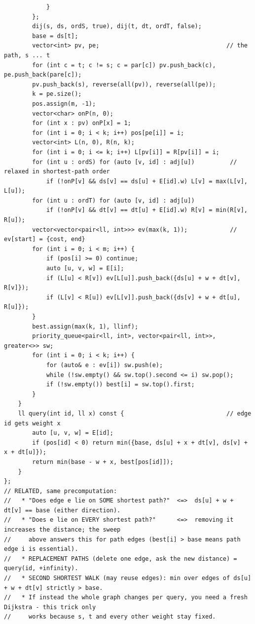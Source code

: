 \documentclass[9pt,a4paper,twocolumn]{extarticle}
\begin{document}
\begin{lstlisting}
            }
        };
        dij(s, ds, ordS, true), dij(t, dt, ordT, false);
        base = ds[t];
        vector<int> pv, pe;                                    // the path, s ... t
        for (int c = t; c != s; c = par[c]) pv.push_back(c), pe.push_back(pare[c]);
        pv.push_back(s), reverse(all(pv)), reverse(all(pe));
        k = pe.size();
        pos.assign(m, -1);
        vector<char> onP(n, 0);
        for (int x : pv) onP[x] = 1;
        for (int i = 0; i < k; i++) pos[pe[i]] = i;
        vector<int> L(n, 0), R(n, k);
        for (int i = 0; i <= k; i++) L[pv[i]] = R[pv[i]] = i;
        for (int u : ordS) for (auto [v, id] : adj[u])          // relaxed in shortest-path order
            if (!onP[v] && ds[v] == ds[u] + E[id].w) L[v] = max(L[v], L[u]);
        for (int u : ordT) for (auto [v, id] : adj[u])
            if (!onP[v] && dt[v] == dt[u] + E[id].w) R[v] = min(R[v], R[u]);
        vector<vector<pair<ll, int>>> ev(max(k, 1));            // ev[start] = {cost, end}
        for (int i = 0; i < m; i++) {
            if (pos[i] >= 0) continue;
            auto [u, v, w] = E[i];
            if (L[u] < R[v]) ev[L[u]].push_back({ds[u] + w + dt[v], R[v]});
            if (L[v] < R[u]) ev[L[v]].push_back({ds[v] + w + dt[u], R[u]});
        }
        best.assign(max(k, 1), llinf);
        priority_queue<pair<ll, int>, vector<pair<ll, int>>, greater<>> sw;
        for (int i = 0; i < k; i++) {
            for (auto& e : ev[i]) sw.push(e);
            while (!sw.empty() && sw.top().second <= i) sw.pop();
            if (!sw.empty()) best[i] = sw.top().first;
        }
    }
    ll query(int id, ll x) const {                             // edge id gets weight x
        auto [u, v, w] = E[id];
        if (pos[id] < 0) return min({base, ds[u] + x + dt[v], ds[v] + x + dt[u]});
        return min(base - w + x, best[pos[id]]);
    }
};
// RELATED, same precomputation:
//   * "Does edge e lie on SOME shortest path?"  <=>  ds[u] + w + dt[v] == base (either direction).
//   * "Does e lie on EVERY shortest path?"      <=>  removing it increases the distance; the sweep
//     above answers this for path edges (best[i] > base means path edge i is essential).
//   * REPLACEMENT PATHS (delete one edge, ask the new distance) = query(id, +infinity).
//   * SECOND SHORTEST WALK (may reuse edges): min over edges of ds[u] + w + dt[v] strictly > base.
//   * If instead the whole graph changes per query, you need a fresh Dijkstra - this trick only
//     works because s, t and every other weight stay fixed.
\end{lstlisting}
\end{document}
